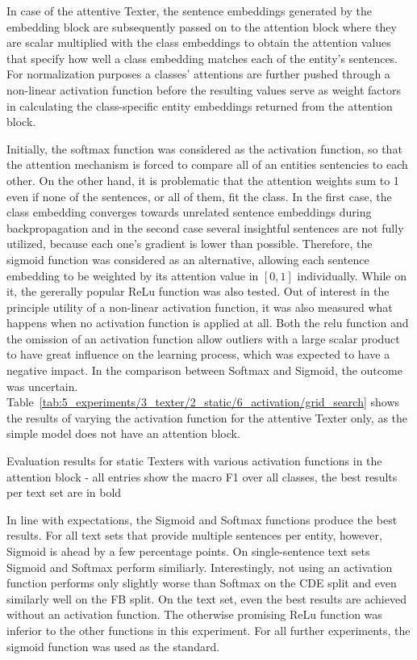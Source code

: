 In case of the attentive Texter, the sentence embeddings generated by the embedding block are subsequently passed on to the attention block where they are scalar multiplied with the class embeddings to obtain the attention values that specify how well a class embedding matches each of the entity's sentences. For normalization purposes a classes' attentions are further pushed through a non-linear activation function before the resulting values serve as weight factors in calculating the class-specific entity embeddings returned from the attention block.

Initially, the softmax function was considered as the activation function, so that the attention mechanism is forced to compare all of an entities sentencies to each other. On the other hand, it is problematic that the attention weights sum to 1 even if none of the sentences, or all of them, fit the class. In the first case, the class embedding converges towards unrelated sentence embeddings during backpropagation and in the second case several insightful sentences are not fully utilized, because each one's gradient is lower than possible. Therefore, the sigmoid function was considered as an alternative, allowing each sentence embedding to be weighted by its attention value in $[0, 1]$ individually. While on it, the gererally popular ReLu function was also tested. Out of interest in the principle utility of a non-linear activation function, it was also measured what happens when no activation function is applied at all. Both the relu function and the omission of an activation function allow outliers with a large scalar product to have great influence on the learning process, which was expected to have a negative impact. In the comparison between Softmax and Sigmoid, the outcome was uncertain. Table~\ref{tab:5_experiments/3_texter/2_static/6_activation/grid_search} shows the results of varying the activation function for the attentive Texter only, as the simple model does not have an attention block.

\begin{table}[t]
    \centering
    
    \caption{Evaluation results for static Texters with various activation functions in the attention block - all entries show the macro F1 over all classes, the best results per text set are in bold}
    \label{tab:5_experiments/3_texter/2_static/6_activation/grid_search}
\end{table}

In line with expectations, the Sigmoid and Softmax functions produce the best results. For all text sets that provide multiple sentences per entity, however, Sigmoid is ahead by a few percentage points. On single-sentence text sets Sigmoid and Softmax perform similiarly. Interestingly, not using an activation function performs only slightly worse than Softmax on the CDE split and even similarly well on the FB split. On the text set, even the best results are achieved without an activation function. The otherwise promising ReLu function was inferior to the other functions in this experiment. For all further experiments, the sigmoid function was used as the standard.
